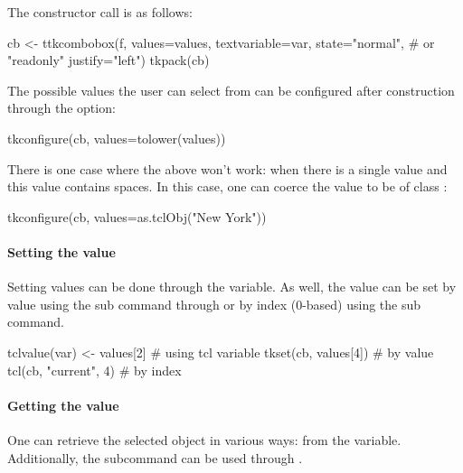 The constructor call is as follows:
\begin{Schunk}
\begin{Sinput}
 cb <- ttkcombobox(f,
                   values=values,
                   textvariable=var,
                   state="normal",     # or "readonly"
                   justify="left")
 tkpack(cb)
\end{Sinput}
\end{Schunk}


The possible values the user can select from can be configured after
construction through the  option:
\begin{Schunk}
\begin{Sinput}
 tkconfigure(cb, values=tolower(values))
\end{Sinput}
\end{Schunk}

There is one case where the above won't work: when there is a single
value and this value contains spaces. In this case, one can coerce the
value to be of class :
\begin{Schunk}
\begin{Sinput}
 tkconfigure(cb, values=as.tclObj("New York"))
\end{Sinput}
\end{Schunk}

\paragraph{Setting the value}
Setting values can be done through the \TCL\/ variable. As well, the
value can be set by value using the  sub
command through  or by index (0-based) using the
 sub command.

\begin{Schunk}
\begin{Sinput}
 tclvalue(var) <- values[2]            # using tcl variable
 tkset(cb, values[4])                  # by value
 tcl(cb, "current", 4)                 # by index
\end{Sinput}
\end{Schunk}


\paragraph{Getting the value}
One can retrieve the selected object in various ways: from the \TCL\/
variable. Additionally, the  subcommand
can be used through .

